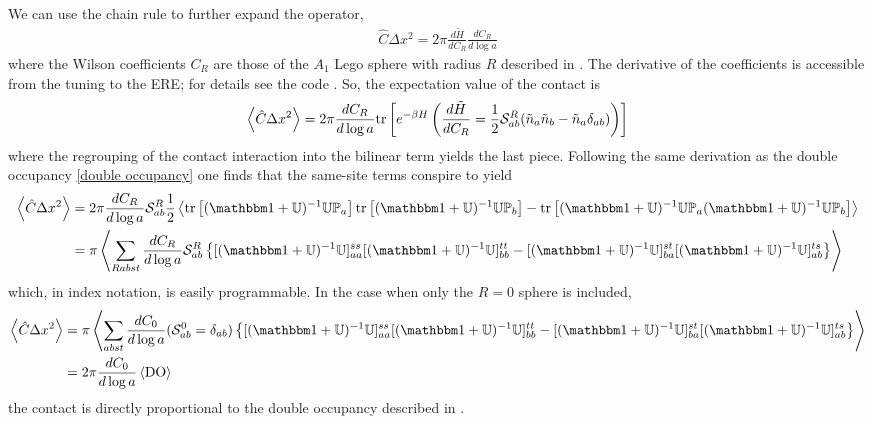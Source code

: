 We can use the chain rule to further expand the operator,
\begin{align}
    \hat{C}\Delta x^2 = 2\pi \frac{d\tilde{H}}{d C_R} \frac{d C_R}{d\log a} 
\end{align}
where the Wilson coefficients $C_R$ are those of the $A_1$ Lego sphere with radius $R$ described in .
The derivative of the coefficients is accessible from the tuning to the ERE; for details see the code .
So, the expectation value of the contact is
\begin{align}
    \left\langle \hat{C} \Delta x^2 \right\rangle
    = 2 \pi \frac{d C_R}{d\log a} \text{tr}\left[e^{-\beta H} \left(\frac{d\tilde{H}}{d C_R} = \frac{1}{2} \mathcal{S}^{R}_{ab} (\tilde{n}_a \tilde{n}_b - \tilde{n}_a \delta_{ab}) \right)\right]
    \label{eq:contact generic}
\end{align}
where the regrouping of the contact interaction into the bilinear term yields the last piece.
Following the same derivation as the double occupancy \eqref{double occupancy} one finds that the same-site terms conspire to yield
\begin{align}
    \expectation{\hat{C} \Delta x^2}
    &= 2 \pi \frac{d C_R}{d\log a} \LegoSphere{R}_{ab} \half\expectation{\tr{(\one + \UU)\inverse \UU \PP_a}\tr{(\one + \UU)\inverse \UU \PP_b} - \tr{(\one+\UU)\inverse \UU \PP_a (\one+\UU)\inverse \UU \PP_b}}
    \nonumber\\
    &= \pi \expectation{\sum_{Rabst} \frac{d C_R}{d\log a} \LegoSphere{R}_{ab} \left\{[(\one+\UU)\inverse \UU]^{ss}_{aa} [(\one+\UU)\inverse \UU]^{tt}_{bb} - [(\one+\UU)\inverse \UU]^{st}_{ba} [(\one+\UU)\inverse \UU]^{ts}_{ab} \right\}}
\end{align}
which, in index notation, is easily programmable.
In the case when only the $R=0$ sphere is included,
\begin{align}
    \expectation{\hat{C} \Delta x^2}
    &= \pi \expectation{\sum_{abst} \frac{d C_0}{d\log a} (\LegoSphere{0}_{ab} = \delta_{ab}) \left\{[(\one+\UU)\inverse \UU]^{ss}_{aa} [(\one+\UU)\inverse \UU]^{tt}_{bb} - [(\one+\UU)\inverse \UU]^{st}_{ba} [(\one+\UU)\inverse \UU]^{ts}_{ab} \right\}}
    \nonumber\\
    &= 2\pi \frac{d C_0}{d\log a} \expectation{ \DoubleOccupancy }
\end{align}
the contact is directly proportional to the double occupancy described in .


